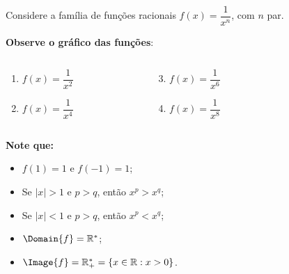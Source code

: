 \begin{frame}
  \begin{columns}[onlytextwidth]
    \begin{column}{0.49\textwidth}
      \vspace*{-0.35cm}
      \begin{example}
        Considere a família de funções racionais $f(x)=\dfrac{1}{x^{n}}$, com $n$ par.
      \end{example}
      \textbf{Observe o gráfico das funções}:
      \vspace*{-0.5cm}
      \begin{columns}[onlytextwidth]
        \begin{column}{0.5\textwidth}
          \begin{enumerate}
            \item< 1- > $f(x)=\dfrac{1}{x^{2}}$
            \item< 2- > $f(x)=\dfrac{1}{x^{4}}$
          \end{enumerate}
        \end{column}
        \begin{column}{0.5\textwidth}
          \begin{enumerate}
            \setcounter{enumi}{2}
            \item< 3- > $f(x)=\dfrac{1}{x^{6}}$
            \item< 4- > $f(x)=\dfrac{1}{x^{8}}$
          \end{enumerate}
        \end{column}
      \end{columns}
      \vspace*{0.35cm}
      \begin{highlight}
        \textbf{Note que:}
        \begin{itemize}
          \item< 1- > $f(1) = 1$ e $f(-1)=1$;
          \item< 4- > Se $|x| > 1$ e $p>q$, então $x^{p} > x^{q}$;
          \item< 4- > Se $|x| < 1$ e $p>q$, então $x^{p} < x^{q}$;
          \item< 4- > $\Domain{f}=\mathbb{R}^{*}$;
          \item< 4- > $\Image{f}=\mathbb{R}^{*}_{+} = \left\{x\in\mathbb{R}:x > 0\right\}$.
        \end{itemize}
      \end{highlight}
    \end{column}
    \begin{column}{0.49\textwidth}
        \begin{figure}
      \end{figure}
    \end{column}
  \end{columns}
\end{frame}

